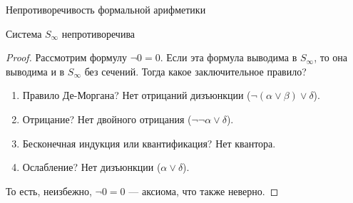 {Непротиворечивость формальной арифметики}
\begin{theorem}Система $S_\infty$ непротиворечива\end{theorem}
\begin{proof}
Рассмотрим формулу $\neg 0=0$.
Если эта формула выводима в $S_\infty$, то она выводима и в $S_\infty$ без сечений.
Тогда какое заключительное правило?
\begin{enumerate}
\item Правило Де-Моргана?  Нет отрицаний дизъюнкции ($\neg(\alpha\vee\beta)\vee\delta$).
\item Отрицание?  Нет двойного отрицания ($\neg\neg\alpha\vee\delta$).
\item Бесконечная индукция или квантификация?  Нет квантора.
\item Ослабление?  Нет дизъюнкции ($\alpha \vee \delta$).
\end{enumerate}

То есть, неизбежно, $\neg 0=0$ --- аксиома, что также неверно.
\end{proof}

